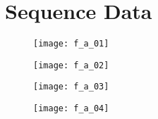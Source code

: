 \chapter{Sequence Data}
\label{chap:seq_data}

\lstset{basicstyle=\footnotesize,breakatwhitespace=true,breaklines=true,frame=single,title=\lstname}

\begin{figure}[h!] \centering \texttt{[image: f\_a\_01]}
    \caption[]{\cite{}}\label{fig:plasmid_pQE30-EC} \end{figure}
\texttt{}

\begin{figure}[h!] \centering \texttt{[image: f\_a\_02]}
    \caption[]{\cite{}}\label{fig:plasmid_pQE30-CE} \end{figure}
\texttt{}

\begin{figure}[h!] \centering \texttt{[image: f\_a\_03]}
    \caption[]{\cite{}}\label{fig:plasmid_pQE30-ECE} \end{figure}
\texttt{}

\begin{figure}[h!] \centering \texttt{[image: f\_a\_04]}
    \caption[]{\cite{}}\label{fig:plasmid_pQE9-COMP} \end{figure}
\texttt{}
